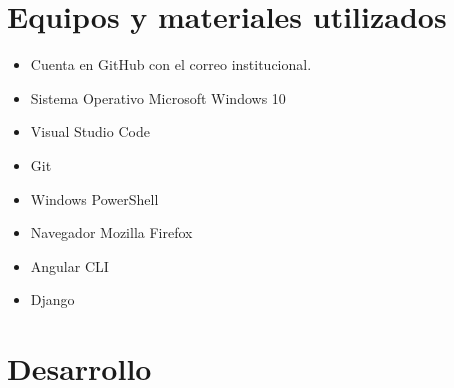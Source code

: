 \documentclass{article}
\begin{document}
\section{Equipos y materiales utilizados}
\begin{itemize}
	\item Cuenta en GitHub con el correo institucional.
	\item Sistema Operativo Microsoft Windows 10
	\item Visual Studio Code
	\item Git
	\item Windows PowerShell
	\item Navegador Mozilla Firefox
	\item Angular CLI
	\item Django
\end{itemize}
\pagebreak

\section{Desarrollo}
\end{document}
